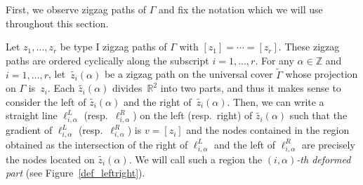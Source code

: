 \documentclass[11pt]{article}
\numberwithin{equation}{section}
\numberwithin{equation}{section}
\numberwithin{figure}{section}
\numberwithin{table}{section}
\newcommand{\ZZ}{\mathbb{Z}}
\newcommand{\RR}{\mathbb{R}}
\begin{document}
First, we observe zigzag paths of $\Gamma$ and fix the notation which we will use throughout this section.

\begin{observation}\label{obs_deformed_part}
Let $z_1,\dots,z_r$ be type I zigzag paths of $\Gamma$ with $[z_1]=\cdots=[z_r]$.
These zigzag paths are ordered cyclically along the subscript $i=1,\dots,r$.
For any $\alpha\in\ZZ$ and $i=1,\dots,r$, let~$\widetilde{z_i}(\alpha)$ be a zigzag path on the universal cover $\widetilde{\Gamma}$ whose projection on $\Gamma$ is~$z_i$.
Each $\widetilde{z_i}(\alpha)$ divides~$\RR^2$ into two parts, and thus it makes sense to consider the left of $\widetilde{z_i}(\alpha)$ and the right of~$\widetilde{z_i}(\alpha)$.
Then, we can write a straight line $\ell_{i,\alpha}^L$ (resp.~$\ell_{i,\alpha}^R$) on the left (resp.\ right) of $\widetilde{z_i}(\alpha)$ such that
the gradient of $\ell_{i,\alpha}^L$ (resp.~$\ell_{i,\alpha}^R$) is $v=[z_i]$ and the nodes contained in the region obtained as the intersection of the right of $\ell_{i,\alpha}^L$ and the left of $\ell_{i,\alpha}^R$ are precisely the nodes located on $\widetilde{z_i}(\alpha)$.
We will call such a region the \emph{$(i,\alpha)$-th deformed part} (see Figure~\ref{def_leftright}).

\begin{figure}[h!]\centering
{}
\end{figure}
\end{observation}
\end{document}
